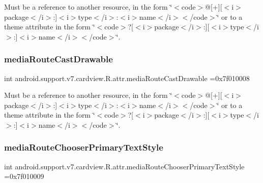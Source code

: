 Must be a reference to another resource, in the form \char`\"{}$<$code$>$@\mbox{[}+\mbox{]}\mbox{[}$<$i$>$package$<$/i$>$\+:\mbox{]}$<$i$>$type$<$/i$>$\+:$<$i$>$name$<$/i$>$$<$/code$>$\char`\"{} or to a theme attribute in the form \char`\"{}$<$code$>$?\mbox{[}$<$i$>$package$<$/i$>$\+:\mbox{]}\mbox{[}$<$i$>$type$<$/i$>$\+:\mbox{]}$<$i$>$name$<$/i$>$$<$/code$>$\char`\"{}. \mbox{\label{classandroid_1_1support_1_1v7_1_1cardview_1_1R_1_1attr_a186bccb4d58a0789448fdd239d851f25}} 
\subsubsection{\texorpdfstring{media\+Route\+Cast\+Drawable}{mediaRouteCastDrawable}}
{\footnotesize\ttfamily int android.\+support.\+v7.\+cardview.\+R.\+attr.\+media\+Route\+Cast\+Drawable =0x7f010008\hspace{0.3cm}{\ttfamily [static]}}

Must be a reference to another resource, in the form \char`\"{}$<$code$>$@\mbox{[}+\mbox{]}\mbox{[}$<$i$>$package$<$/i$>$\+:\mbox{]}$<$i$>$type$<$/i$>$\+:$<$i$>$name$<$/i$>$$<$/code$>$\char`\"{} or to a theme attribute in the form \char`\"{}$<$code$>$?\mbox{[}$<$i$>$package$<$/i$>$\+:\mbox{]}\mbox{[}$<$i$>$type$<$/i$>$\+:\mbox{]}$<$i$>$name$<$/i$>$$<$/code$>$\char`\"{}. \mbox{\label{classandroid_1_1support_1_1v7_1_1cardview_1_1R_1_1attr_ad2d45de3db3f45301165c149e4e20811}} 
\subsubsection{\texorpdfstring{media\+Route\+Chooser\+Primary\+Text\+Style}{mediaRouteChooserPrimaryTextStyle}}
{\footnotesize\ttfamily int android.\+support.\+v7.\+cardview.\+R.\+attr.\+media\+Route\+Chooser\+Primary\+Text\+Style =0x7f010009\hspace{0.3cm}{\ttfamily [static]}}

